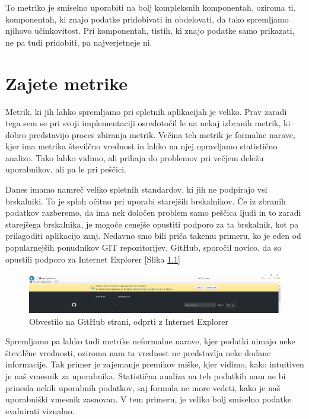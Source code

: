 \documentclass[a4paper, 12pt]{book}
\begin{document}
To metriko je smiselno uporabiti na bolj kompleksnih komponentah, oziroma ti.  komponentah, ki znajo podatke pridobivati in obdelovati, da tako spremljamo njihovo učinkovitost. Pri  komponentah, tistih, ki znajo podatke samo prikazati, ne pa tudi pridobiti, pa najverjetneje ni.

\chapter{Zajete metrike}
\label{ch2}

Metrik, ki jih lahko spremljamo pri spletnih aplikacijah je veliko. Prav zaradi tega sem se pri svoji implementaciji osredotočil le na nekaj izbranih metrik, ki dobro predstavijo proces zbiranja metrik. Večina teh metrik je formalne narave, kjer ima metrika številčno vrednost in lahko na njej opravljamo statistično analizo. Tako lahko vidimo, ali prihaja do problemov pri večjem deležu uporabnikov, ali pa le pri peščici.

Danes imamo namreč veliko spletnih standardov, ki jih ne podpirajo vsi brskalniki. To je sploh očitno pri uporabi starejših brskalnikov. Če iz zbranih podatkov razberemo, da ima nek določen problem samo peščica ljudi in to zaradi starejšega brskalnika, je mogoče cenejše opustiti podporo za ta brskalnik, kot pa prilagoditi aplikacijo zanj. Nedavno smo bili priča takemu primeru, ko je eden od popularnejših ponudnikov GIT repozitorijev, GitHub, sporočil novico, da so opustili podporo za Internet Explorer [Slika \ref{img:github_ie}]

\begin{figure}[h]
	\begin{center}
		\includegraphics[width=1\textwidth]{github_end_support.png}
	\end{center}
	\caption{Obvestilo na GitHub strani, odprti z Internet Explorer}
	\label{img:github_ie}
\end{figure}

Spremljamo pa lahko tudi metrike neformalne narave, kjer podatki nimajo neke številčne vrednosti, oziroma nam ta vrednost ne predstavlja neke dodane informacije. Tak primer je zajemanje premikov miške, kjer vidimo, kako intuitiven je naš vmesnik za uporabnika. Statistična analiza na teh podatkih nam ne bi prinesla nekih uporabnih podatkov, saj formula ne more vedeti, kako je naš uporabniški vmesnik zasnovan. V tem primeru, je veliko bolj smiselno podatke evaluirati vizualno.
\end{document}
